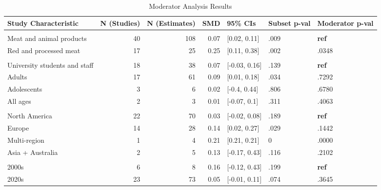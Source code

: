 \documentclass[sn-nature,referee,pdflatex]{sn-jnl}
\begin{document}
\begin{table}[!h]
\centering
\caption{\label{tab:table_two}Moderator Analysis Results}
\centering
\begin{tabular}[t]{lrrrlll}
\toprule
Study Characteristic & N (Studies) & N (Estimates) & SMD & 95\% CIs & Subset p-val & Moderator p-val\\
\midrule
\addlinespace[0.3em]
\multicolumn{7}{l}{\textbf{Outcome}}\\
\hspace{1em}Meat and animal products & 40 & 108 & 0.07 & {}[0.02, 0.11] & .009 & \textbf{ref}\\
\hspace{1em}Red and processed meat & 17 & 25 & 0.25 & {}[0.11, 0.38] & .002 & .0348\\
\addlinespace[0.3em]
\multicolumn{7}{l}{\textbf{Population}}\\
\hspace{1em}University students and staff & 18 & 38 & 0.07 & {}[-0.03, 0.16] & .139 & \textbf{ref}\\
\hspace{1em}Adults & 17 & 61 & 0.09 & {}[0.01, 0.18] & .034 & .7292\\
\hspace{1em}Adolescents & 3 & 6 & 0.02 & {}[-0.4, 0.44] & .806 & .6780\\
\hspace{1em}All ages & 2 & 3 & 0.01 & {}[-0.07, 0.1] & .311 & .4063\\
\addlinespace[0.3em]
\multicolumn{7}{l}{\textbf{Region}}\\
\hspace{1em}North America & 22 & 70 & 0.03 & {}[-0.02, 0.08] & .189 & \textbf{ref}\\
\hspace{1em}Europe & 14 & 28 & 0.14 & {}[0.02, 0.27] & .029 & .1442\\
\hspace{1em}Multi-region & 1 & 4 & 0.21 & {}[0.21, 0.21] & 0 & .0000\\
\hspace{1em}Asia + Australia & 2 & 5 & 0.13 & {}[-0.17, 0.43] & .116 & .2102\\
\addlinespace[0.3em]
\multicolumn{7}{l}{\textbf{Publication Decade}}\\
\hspace{1em}2000s & 6 & 8 & 0.16 & {}[-0.12, 0.43] & .199 & \textbf{ref}\\
\hspace{1em}2020s & 23 & 73 & 0.05 & {}[-0.01, 0.11] & .074 & .3645\\

\end{tabular}
\end{table}
\end{document}
